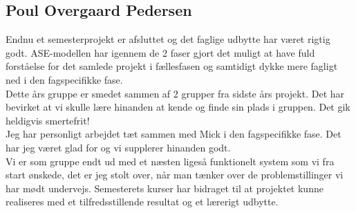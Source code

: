\subsection*{Poul Overgaard Pedersen}

Endnu et semesterprojekt er afsluttet og det faglige udbytte har været rigtig godt. ASE-modellen har igennem de 2 faser gjort det muligt at have fuld forståelse for det samlede projekt i fællesfasen og samtidigt dykke mere fagligt ned i den fagspecifikke fase.\\

Dette års gruppe er smedet sammen af 2 grupper fra sidste års projekt. Det har bevirket at vi skulle lære hinanden at kende og finde sin plads i gruppen. Det gik heldigvis smertefrit! \\

Jeg har personligt arbejdet tæt sammen med Mick i den fagspecifikke fase. Det har jeg været glad for og vi supplerer hinanden godt. \\

Vi er som gruppe endt ud med et næsten ligeså funktionelt system som vi fra start ønskede, det er jeg stolt over, når man tænker over de problemstillinger vi har mødt undervejs. Semesterets kurser har bidraget til at projektet kunne realiseres med et tilfredsstillende resultat og et lærerigt udbytte. \\